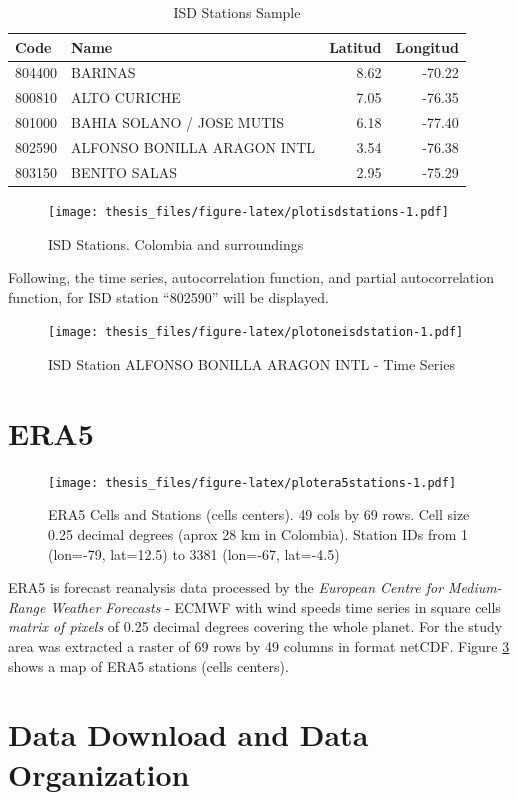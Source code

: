 \documentclass[12pt,oneside]{reedthesis}
\begin{document}
\begingroup\fontsize{10}{12}\selectfont
\begin{longtable}[t]{llrr}
\caption[ISD Stations]{\label{tab:tableisdstations}ISD Stations Sample}\\
\toprule
Code & Name & Latitud & Longitud\\
\midrule
804400 & BARINAS & 8.62 & -70.22\\
800810 & ALTO CURICHE & 7.05 & -76.35\\
801000 & BAHIA SOLANO / JOSE MUTIS & 6.18 & -77.40\\
802590 & ALFONSO BONILLA ARAGON INTL & 3.54 & -76.38\\
803150 & BENITO SALAS & 2.95 & -75.29\\
\bottomrule
\end{longtable}
\endgroup{}
\begin{figure}
\centering
\texttt{[image: thesis\_files/figure-latex/plotisdstations-1.pdf]}
\caption{\label{fig:plotisdstations}ISD Stations. Colombia and surroundings}
\end{figure}
Following, the time series, autocorrelation function, and partial autocorrelation function, for ISD station ``802590'' will be displayed.
\begin{figure}
\centering
\texttt{[image: thesis\_files/figure-latex/plotoneisdstation-1.pdf]}
\caption{\label{fig:plotoneisdstation}ISD Station ALFONSO BONILLA ARAGON INTL - Time Series}
\end{figure}
\hypertarget{era5}{%
\section{ERA5}\label{era5}}
\begin{figure}
\centering
\texttt{[image: thesis\_files/figure-latex/plotera5stations-1.pdf]}
\caption{\label{fig:plotera5stations}ERA5 Cells and Stations (cells centers). 49 cols by 69 rows. Cell size 0.25 decimal degrees (aprox 28 km in Colombia). Station IDs from 1 (lon=-79, lat=12.5) to 3381 (lon=-67, lat=-4.5)}
\end{figure}
ERA5 is forecast reanalysis data processed by the \emph{European Centre for Medium-Range Weather Forecasts} - ECMWF with wind speeds time series in square cells \emph{matrix of pixels} of 0.25 decimal degrees covering the whole planet. For the study area was extracted a raster of 69 rows by 49 columns in format netCDF. Figure \ref{fig:plotera5stations} shows a map of ERA5 stations (cells centers).

\hypertarget{data-download-and-data-organization}{%
\section{Data Download and Data Organization}\label{data-download-and-data-organization}}
\end{document}
